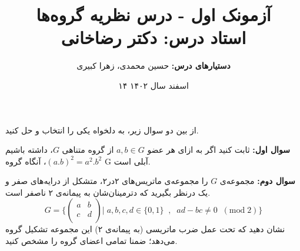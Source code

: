 \documentclass[12pt]{article}
\begin{document}
	
	\title{آزمونک اول - درس نظریه‌ گروه‌ها
		\\
	{\normalsize 
	\textbf{استاد درس:}
	دکتر رضاخانی
	}
	}
	\author{
	\small
	\textbf{دستیارهای درس:}
	 حسین محمدی، زهرا کبیری
	} 
\date{۱۴ اسفند سال ۱۴۰۲}
	\maketitle
	از بین دو سوال زیر، به دلخواه یکی را انتخاب و حل کنید.
	
	\vspace{1.5em}
	\noindent
	\textbf{ سوال اول:}
 ثابت کنید اگر به ازای هر عضو 
 $a,b \in G$
 از گروه متناهی 
 $G$،
  داشته باشیم 
  $(a.b)^2 = a^2.b^2$، آنگاه
  گروه G آبلی است.
	
	\vspace{1.5em}
	\noindent
	\textbf{ سوال دوم:}
	مجموعه‌ی 
	$G$ را مجموعه‌ی ماتریس‌های
	۲در۲، متشکل از درایه‌های صفر و یک درنظر بگیرید که دترمینان‌شان به پیمانه‌ی ۲ ناصفر است.
	\[
	G= \{
	\begin{pmatrix}
		a & b \\
		c & d \\
	\end{pmatrix}
	\Big| \;a,b,c,d \in \{0,1\}
	\;\; ,\;\; ad-bc \neq 0 \;\;(\text{mod} \; 2)
	\}
	\]
	نشان دهید که تحت عمل ضرب ماتریسی (به پیمانه‌ی ۲) این مجموعه تشکیل گروه می‌دهد؛ ضمنا تمامی اعضای گروه را مشخص کنید.
	

	
	
	
	
	
	

	
	

	
	
	
	
	
	
	
	
	
	
\end{document}
